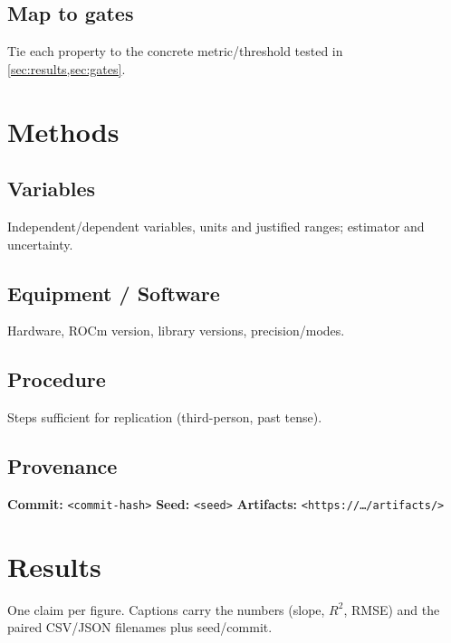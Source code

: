 \documentclass[%
 reprint,                %
 superscriptaddress,     %
 aps,                    %
 prx,                    %
]{revtex4-2}
\begin{document}
\subsection{Map to gates}
Tie each property to the concrete metric/threshold tested in \cref{sec:results,sec:gates}.

\section{Methods}
\subsection{Variables}
Independent/dependent variables, units and justified ranges; estimator and uncertainty.

\subsection{Equipment / Software}
Hardware, ROCm version, library versions, precision/modes.

\subsection{Procedure}
Steps sufficient for replication (third-person, past tense).

\subsection{Provenance}
\noindent\textbf{Commit:} \texttt{<commit-hash>}\quad
\textbf{Seed:} \texttt{<seed>}\quad
\textbf{Artifacts:} \texttt{<https://…/artifacts/>}

\section{Results}
\label{sec:results}
One claim per figure. Captions carry the numbers (slope, $R^2$, RMSE) and the paired CSV/JSON
filenames plus seed/commit.
\end{document}
